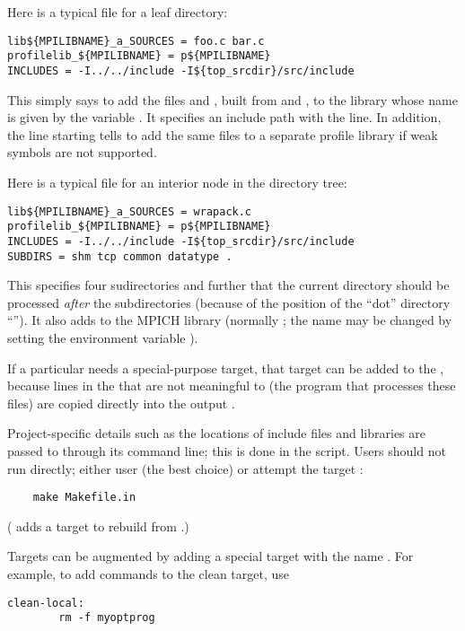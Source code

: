 \documentclass{article}
\begin{document}
Here is a typical  file for a leaf directory:
\begin{verbatim}
lib${MPILIBNAME}_a_SOURCES = foo.c bar.c
profilelib_${MPILIBNAME} = p${MPILIBNAME}
INCLUDES = -I../../include -I${top_srcdir}/src/include
\end{verbatim}
This simply says to add the files  and , built
from  and , to the library whose name is given
by the  variable .  It specifies an
include path with the  line.  In addition, the line
starting  tells  to add the same
files to a separate profile library if weak symbols are not supported.

Here is a typical  file for an interior node in the
directory tree:
\begin{verbatim}
lib${MPILIBNAME}_a_SOURCES = wrapack.c 
profilelib_${MPILIBNAME} = p${MPILIBNAME}
INCLUDES = -I../../include -I${top_srcdir}/src/include
SUBDIRS = shm tcp common datatype .
\end{verbatim}
This specifies four sudirectories and further that the current directory
should be processed \emph{after} the subdirectories (because of the position
of the ``dot'' directory ``'').  It also adds 
to the MPICH library (normally ; the name may be
changed by setting the environment variable ).

If a particular  needs a special-purpose target, that target
can be added to the , because lines in the
 that are not meaningful to  (the
program that processes these 
files) are copied directly into the output .  

Project-specific details such as the locations of include files and libraries
are passed to  through its command line; this is done in the
 script.  Users should not
run  directly; either user 
(the best choice) or attempt the  target
:
\begin{verbatim}
    make Makefile.in
\end{verbatim}
( adds a target to rebuild  from
.) 

Targets can be augmented by adding a special target with the name
.  For example, to add commands to the clean
target, use
\begin{verbatim}
clean-local:
        rm -f myoptprog
\end{verbatim}
\end{document}
